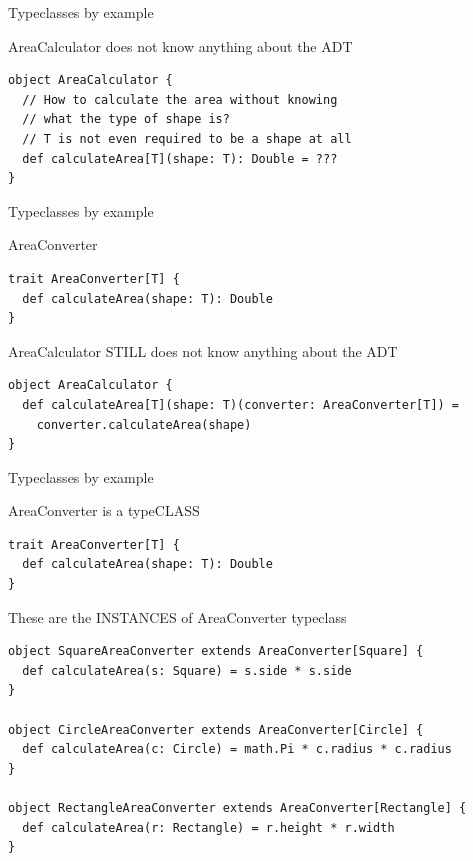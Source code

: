 \begin{frame}[fragile]{Typeclasses by example}
\begin{alertblock}{AreaCalculator does not know anything about the ADT}
\begin{lstlisting}
object AreaCalculator {
  // How to calculate the area without knowing
  // what the type of shape is?
  // T is not even required to be a shape at all
  def calculateArea[T](shape: T): Double = ???
}
\end{lstlisting}
\end{alertblock}
\end{frame}

\begin{frame}[fragile]{Typeclasses by example}
\begin{block}{AreaConverter}
\begin{lstlisting}
trait AreaConverter[T] {
  def calculateArea(shape: T): Double
}
\end{lstlisting}
\end{block}
\begin{block}{AreaCalculator STILL does not know anything about the ADT}
\begin{lstlisting}
object AreaCalculator {
  def calculateArea[T](shape: T)(converter: AreaConverter[T]) =
    converter.calculateArea(shape)
}
\end{lstlisting}
\end{block}
\end{frame}

\begin{frame}[fragile]{Typeclasses by example}
\begin{block}{AreaConverter is a typeCLASS}
\begin{lstlisting}
trait AreaConverter[T] {
  def calculateArea(shape: T): Double
}
\end{lstlisting}
\end{block}
\begin{block}{These are the INSTANCES of AreaConverter typeclass}
\begin{lstlisting}
object SquareAreaConverter extends AreaConverter[Square] {
  def calculateArea(s: Square) = s.side * s.side
}

object CircleAreaConverter extends AreaConverter[Circle] {
  def calculateArea(c: Circle) = math.Pi * c.radius * c.radius
}

object RectangleAreaConverter extends AreaConverter[Rectangle] {
  def calculateArea(r: Rectangle) = r.height * r.width
}
\end{lstlisting}
\end{block}
\end{frame}

